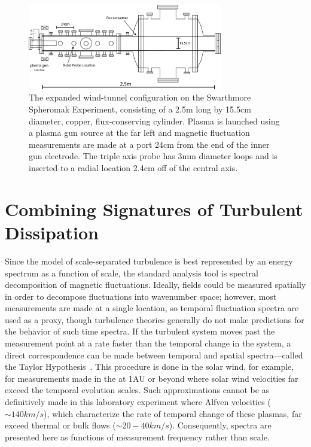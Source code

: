 \documentclass[aip,pop,amsmath,amssymb,preprint,superscriptaddress]{revtex4-1} %
\begin{document}
\begin{figure}
\centerline{
\includegraphics[width=8.5cm]{figure1.jpg}}
\caption{\label{fig:diagram} The expanded wind-tunnel configuration on the Swarthmore Spheromak Experiment, consisting of a 2.5m long by 15.5cm diameter, copper, flux-conserving cylinder. Plasma is launched using a plasma gun source at the far left and magnetic fluctuation measurements are made at a port 24cm from the end of the inner gun electrode. The triple axis probe has 3mm diameter loops and is inserted to a radial location 2.4cm off of the central axis.}
\end{figure}

\section{Combining Signatures of Turbulent Dissipation}

Since the model of scale-separated turbulence is best represented by an energy spectrum as a function of scale, the standard analysis tool is spectral decomposition of magnetic fluctuations. Ideally, fields could be measured spatially in order to decompose fluctuations into wavenumber space; however, most measurements are made at a single location, so temporal fluctuation spectra are used as a proxy, though turbulence theories generally do not make predictions for the behavior of such time spectra. If the turbulent system moves past the measurement point at a rate faster than the temporal change in the system, a direct correspondence can be made between temporal and spatial spectra---called the Taylor Hypothesis~\cite{deWit2013}. This procedure is done in the solar wind, for example, for measurements made in the at 1AU or beyond where solar wind velocities far exceed the temporal evolution scales. Such approximations cannot be as definitively made in this laboratory experiment where Alfven velocities ($\sim 140km/s$), which characterize the rate of temporal change of these plasmas, far exceed thermal or bulk flows ($\sim 20-40km/s$). Consequently, spectra are presented here as functions of measurement frequency rather than scale.
\end{document}
